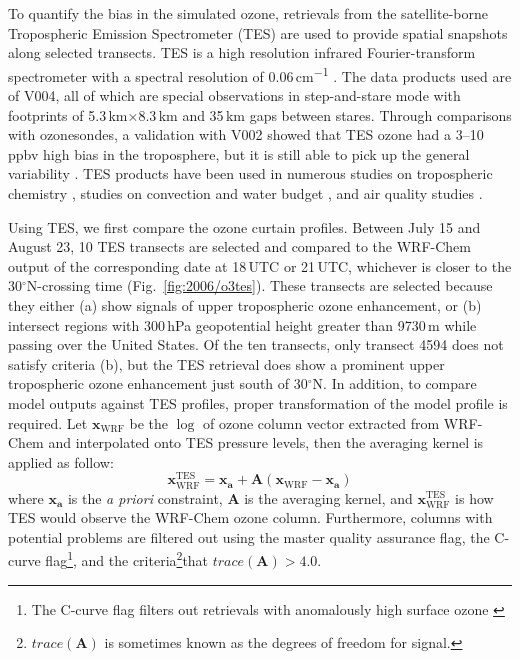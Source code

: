 To quantify the bias in the simulated ozone, retrievals from the satellite-borne Tropospheric Emission Spectrometer (TES) are used
to provide spatial snapshots along selected transects. TES is a high resolution infrared Fourier-transform spectrometer with a spectral
resolution of 0.06\,\unit{cm^{-1}} \citep{Beer:2006fk}. The data products used are of V004, all of which are special observations in
step-and-stare mode with footprints of 5.3\,\unit{km}$\times$8.3\,\unit{km} and 35\,\unit{km} gaps between stares. Through comparisons
with ozonesondes, a validation with V002 showed that TES ozone had a 3--10\,\unit{ppbv} high bias in the troposphere, but it is still
able to pick up the general variability \citep{Nassar:2008mw}. TES products have been used in numerous studies on tropospheric
chemistry \citep[e.g.][]{Hegarty:2010vn,Voulgarakis:2011fk}, studies on convection and water budget \citep[e.g.][]{Brown:2008zr,Risi:2010ys},
and air quality studies \citep[e.g.][]{Mcmillan:2010kx, Wang:2011uq}.

Using TES, we first compare the ozone curtain profiles. Between July 15 and August 23, 10 TES transects are selected and compared to
the WRF-Chem output of the corresponding date at 18\,UTC or 21\,UTC, whichever is closer to the 30$^\circ$N-crossing time (Fig.~\ref{fig:2006/o3tes}).
These transects are selected because they either (a) show signals of upper tropospheric ozone enhancement, or (b) intersect regions
with 300\,\unit{hPa} geopotential height greater than 9730\,\unit{m} while passing over the United States. Of the ten transects, only transect 4594
does not satisfy criteria (b), but the TES retrieval does show a prominent upper tropospheric ozone enhancement just south of 30$^\circ$N. In
addition, to compare model outputs against TES profiles, proper transformation of the model profile is required. Let $\mathbf{x}_{\mathrm{WRF}}$
be the $\log$ of ozone column vector extracted from WRF-Chem and interpolated onto TES pressure levels, then the averaging kernel is applied
as follow:
	\begin{equation}\label{eqn:TES-AK}
		\mathbf{x}_{\mathrm{WRF}}^{\mathrm{TES}} = \mathbf{x_a} + \mathbf{A}\left(\mathbf{x}_{\mathrm{WRF}}-\mathbf{x_a}\right)
	\end{equation}
where $\mathbf{x_a}$ is the {\it a priori} constraint, $\mathbf{A}$ is the averaging kernel, and $\mathbf{x}_{\mathrm{WRF}}^{\mathrm{TES}}$
is how TES would observe the WRF-Chem ozone column. Furthermore, columns with potential problems are filtered out using the master quality
assurance flag, the C-curve flag\footnote{The C-curve flag filters out retrievals with anomalously high surface ozone \citep{Zhang:2010fk}}, and
the criteria\footnote{$trace(\mathbf{A})$ is sometimes known as the degrees of freedom for signal.}that $trace(\mathbf{A})>4.0$.
	
